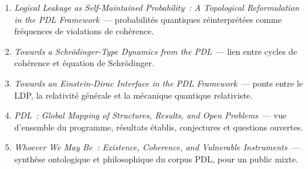 \documentclass[12pt, a4paper, openright]{book}
\begin{document}
\begin{enumerate}
\item \textit{Logical Leakage as Self-Maintained Probability~: A Topological Reformulation in the PDL Framework}~--- probabilités quantiques réinterprétées comme fréquences de violations de cohérence.

\item \textit{Towards a Schrödinger-Type Dynamics from the PDL}~--- lien entre cycles de cohérence et équation de Schrödinger.

\item \textit{Towards an Einstein-Dirac Interface in the PDL Framework}~--- ponts entre le LDP, la relativité générale et la mécanique quantique relativiste.

\item \textit{PDL~: Global Mapping of Structures, Results, and Open Problems}~--- vue d'ensemble du programme, résultats établis, conjectures et questions ouvertes.

\item \textit{Whoever We May Be~: Existence, Coherence, and Vulnerable Instruments}~--- synthèse ontologique et philosophique du corpus PDL, pour un public mixte.

\end{enumerate}

\end{document}
